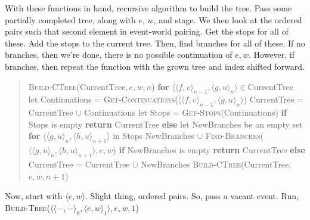 \begin{note}
  With these functions in hand, recursive algorithm to build the tree.
  Pass some partially completed tree, along with \(e\), \(w\), and stage.
  We then look at the ordered pairs such that second element in event-world pairing.
  Get the stops for all of these.
  Add the stops to the current tree.
  Then, find branches for all of these.
  If no branches, then we're done, there is no possible continuation of \(e,w\).
  However, if branches, then repeat the function with the grown tree and index shifted forward.

  \begin{quote}
    \textsc{Build-CTree}(\(\text{CurrentTree}, e, w, n\))\newline
    \textbf{for} \(\langle \langle f,v \rangle_{n - 1}, \langle g,u \rangle_{n}\rangle \in \text{CurrentTree}\)\newline
    \phantom{mm} let Continuations = \textsc{Get-Continuations}(\(\langle \langle f,v \rangle_{n - 1}, \langle g,u \rangle_{n}\rangle\))\newline
    \phantom{mm} CurrentTree = CurrentTree \(\cup\) Continuations\newline
    \phantom{mm} let Stops = \textsc{Get-Stops}(Continuations)\newline
    \phantom{mm} \textbf{if} Stops is empty\newline
    \phantom{mmmm} \textbf{return} CurrentTree\newline
    \phantom{mm} \textbf{else}\newline
    \phantom{mmmm} let NewBranches be an empty set\newline
    \phantom{mmmm} \textbf{for} \(\langle \langle g,u \rangle_{n}, \langle h,u \rangle_{n+1}\rangle\) in Stops\newline
    \phantom{mmmmmm} NewBranches \(\cup\) \textsc{Find-Branches}(\(\langle \langle g,u \rangle_{n}, \langle h,u \rangle_{n+1}\rangle, e, w\))\newline
    \phantom{mmmm}\textbf{if} NewBranches is empty\newline
    \phantom{mmmmmm} \textbf{return} CurrentTree\newline
    \phantom{mmmm}\textbf{else}\newline
    \phantom{mmmmmm} CurrentTree = CurrentTree \(\cup\) NewBranches\newline
    \phantom{mmmmmm} \textsc{Build-CTree}(CurrentTree, \(e,w, n+1\))\newline
  \end{quote}

  Now, start with \(\langle e,w \rangle\).
  Slight thing, ordered pairs.
  So, pass a vacant event.
  Run, \textsc{Build-Tree}(\(\langle \langle -,- \rangle_{0}, \langle e,w \rangle_{1} \rangle, e, w, 1\))
\end{note}

